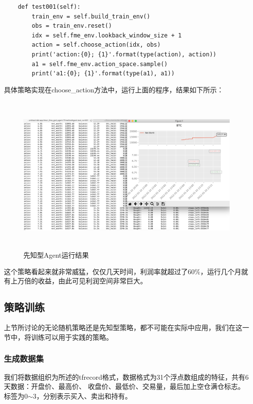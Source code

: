 \documentclass{article}
\begin{document}
\begin{lstlisting}
    def test001(self):
        train_env = self.build_train_env()
        obs = train_env.reset()
        idx = self.fme_env.lookback_window_size + 1
        action = self.choose_action(idx, obs)
        print('action:{0}; {1}'.format(type(action), action))
        a1 = self.fme_env.action_space.sample()
        print('a1:{0}; {1}'.format(type(a1), a1))
\end{lstlisting}
具体策略实现在choose\_action方法中，运行上面的程序，结果如下所示：
\begin{figure}[H]
    \caption{先知型Agent运行结果}
    \label{f000092}
    \centering
    \includegraphics[height=8cm]{images/f000092}
\end{figure}
这个策略看起来就非常威猛，仅仅几天时间，利润率就超过了60\%，运行几个月就有上万倍的收益，由此可见利润空间非常巨大。


\subsection{策略训练}
上节所讨论的无论随机策略还是先知型策略，都不可能在实际中应用，我们在这一节中，将训练可以用于实践的策略。
\subsubsection{生成数据集}
我们将数据组织为\cite{r000008}所述的tfrecord格式，数据格式为31个浮点数组成的特征，共有6天数据：开盘价、最高价、
收盘价、最低价、交易量，最后加上空仓满仓标志。标签为0$\sim$3，分别表示买入、卖出和持有。\newline
\end{document}
